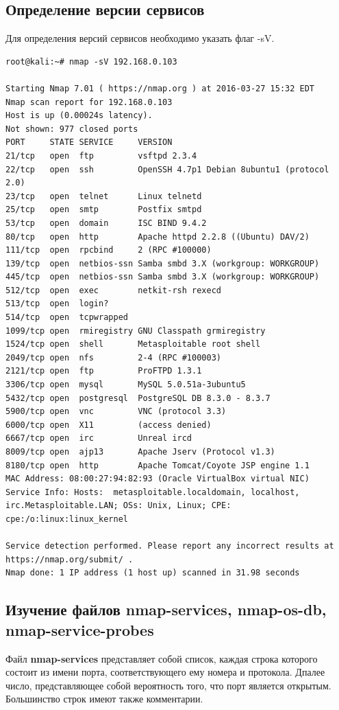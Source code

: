 \documentclass[10pt,a4paper]{report}
\begin{document}
\subsection{Определение версии сервисов}
Для определения версий сервисов необходимо указать флаг -sV.
\begin{verbatim}
root@kali:~# nmap -sV 192.168.0.103

Starting Nmap 7.01 ( https://nmap.org ) at 2016-03-27 15:32 EDT
Nmap scan report for 192.168.0.103
Host is up (0.00024s latency).
Not shown: 977 closed ports
PORT     STATE SERVICE     VERSION
21/tcp   open  ftp         vsftpd 2.3.4
22/tcp   open  ssh         OpenSSH 4.7p1 Debian 8ubuntu1 (protocol 2.0)
23/tcp   open  telnet      Linux telnetd
25/tcp   open  smtp        Postfix smtpd
53/tcp   open  domain      ISC BIND 9.4.2
80/tcp   open  http        Apache httpd 2.2.8 ((Ubuntu) DAV/2)
111/tcp  open  rpcbind     2 (RPC #100000)
139/tcp  open  netbios-ssn Samba smbd 3.X (workgroup: WORKGROUP)
445/tcp  open  netbios-ssn Samba smbd 3.X (workgroup: WORKGROUP)
512/tcp  open  exec        netkit-rsh rexecd
513/tcp  open  login?
514/tcp  open  tcpwrapped
1099/tcp open  rmiregistry GNU Classpath grmiregistry
1524/tcp open  shell       Metasploitable root shell
2049/tcp open  nfs         2-4 (RPC #100003)
2121/tcp open  ftp         ProFTPD 1.3.1
3306/tcp open  mysql       MySQL 5.0.51a-3ubuntu5
5432/tcp open  postgresql  PostgreSQL DB 8.3.0 - 8.3.7
5900/tcp open  vnc         VNC (protocol 3.3)
6000/tcp open  X11         (access denied)
6667/tcp open  irc         Unreal ircd
8009/tcp open  ajp13       Apache Jserv (Protocol v1.3)
8180/tcp open  http        Apache Tomcat/Coyote JSP engine 1.1
MAC Address: 08:00:27:94:82:93 (Oracle VirtualBox virtual NIC)
Service Info: Hosts:  metasploitable.localdomain, localhost, irc.Metasploitable.LAN; OSs: Unix, Linux; CPE: cpe:/o:linux:linux_kernel

Service detection performed. Please report any incorrect results at https://nmap.org/submit/ .
Nmap done: 1 IP address (1 host up) scanned in 31.98 seconds
\end{verbatim}
\subsection{Изучение файлов nmap-services, nmap-os-db, nmap-service-probes}
Файл \textbf{nmap-services} представляет собой список, каждая строка которого состоит из имени порта, соответствующего ему номера и протокола. Дпалее число, представляющее собой вероятность того, что порт является открытым. Большинство строк имеют также комментарии.
\end{document}
